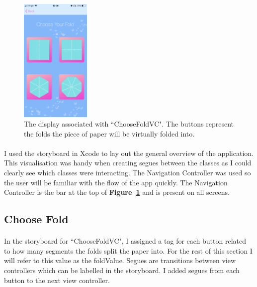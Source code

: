 \documentclass[11pt]{article}
\begin{document}
    \begin{figure}
                        \centering
                        \includegraphics[width=0.3\textwidth]{KiriZen/chooseFold}
                        \caption{The display associated with ``ChooseFoldVC". The buttons represent the folds the piece of paper will be virtually folded into.}
                        \label{fig:kiriZen-chooseFold}
                    \end{figure}
    

    \paragraph{}
    I used the storyboard in Xcode to lay out the general overview of the application. This visualisation was handy when creating segues between the classes as I could clearly see which classes were interacting. The Navigation Controller was used so the user will be familiar with the flow of the app quickly. The Navigation Controller is the bar at the top of \textbf{Figure~\ref{fig:kiriZen-chooseFold}} and is present on all screens.
    
        \subsection{Choose Fold}

        \paragraph{}
            In the storyboard for ``ChooseFoldVC", I assigned a tag for each button related to how many segments the folds split the paper into. For the rest of this section I will refer to this value as the foldValue. Segues are transitions between view controllers which can be labelled in the storyboard. I added segues from each button to the next view controller.
                    
\end{document}
